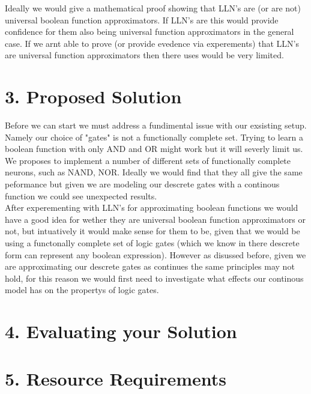 \documentclass[11pt, a4paper, twoside, openright]{report}
\begin{document}
Ideally we would give a mathematical proof showing that LLN's are (or are not) universal boolean function approximators. If LLN's are this would provide confidence for them also being universal function approximators in the general case. If we arnt able to prove (or provide evedence via experements) that LLN's are universal function approximators then there uses would be very limited.

\section*{3. Proposed Solution}

Before we can start we must address a fundimental issue with our exsisting setup.  Namely our choice of "gates" is not a functionally complete set. Trying to learn a boolean function with only AND and OR might work but it will severly limit us. We proposes to implement a number of different sets of functionally complete neurons, such as NAND, NOR. Ideally we would find that they all give the same peformance but given we are modeling our descrete gates with a continous function we could see unexpected results. \\

After experementing with LLN's for approximating boolean functions we would have a good idea for wether they are universal boolean function approximators or not, but intuatively it would make sense for them to be, given that we would be using a functonally complete set of logic gates (which we know in there descrete form can represent any boolean expression). However as disussed before, given we are approximating our descrete gates as continues the same principles may not hold, for this reason we would first need to investigate what effects our continous model has on the propertys of logic gates.

\section*{4. Evaluating your Solution}

\section*{5. Resource Requirements}

\backmatter

%


\end{document}
